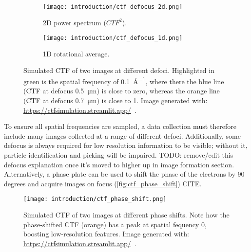\begin{figure}[ht]
    \centering
    \begin{subfigure}{.6\textwidth}
        \centering
        \texttt{[image: introduction/ctf\_defocus\_2d.png]}
        \caption{2D power spectrum ($CTF^2$).}
        \label{fig:ctf_defocus_2d}
    \end{subfigure}%

    \begin{subfigure}{\textwidth}
        \centering
        \texttt{[image: introduction/ctf\_defocus\_1d.png]}
        \caption{1D rotational average.}
        \label{fig:ctf_defocus_1d}
    \end{subfigure}%

    \caption[CTF: effect of defocus]{Simulated CTF of two images at different defoci. Highlighted in green is the spatial frequency of \qty{0.1}{\angstrom^{-1}}, where there the blue line (CTF at defocus \qty{0.5}{\micro\meter}) is close to zero, whereas the orange line (CTF at defocus \qty{0.7}{\micro\meter}) is close to 1. Image generated with: \url{https://ctfsimulation.streamlit.app/}~\cite{jiangWebbasedSimulationContrast2001}.}
    \label{fig:ctf_defocus}
\end{figure}

To ensure all spatial frequencies are sampled, a data collection must therefore include many images collected at a range of different defoci.
Additionally, some defocus is always required for low resolution information to be visible; without it, particle identification and picking will be impaired.
TODO: remove/edit this defocus explanation once it's moved to higher up in image formation section.
Alternatively, a phase plate can be used to shift the phase of the electrons by 90 degrees and acquire images on focus (\autoref{fig:ctf_phase_shift}) CITE.

\begin{figure}[ht]
    \centering
    \texttt{[image: introduction/ctf\_phase\_shift.png]}
    \caption[CTF: effect of phase shift]{Simulated CTF of two images at different phase shifts. Note how the phase-shifted CTF (orange) has a peak at spatial fequency \num{0}, boosting low-resolution features. Image generated with: \url{https://ctfsimulation.streamlit.app/}~\cite{jiangWebbasedSimulationContrast2001}.}
    \label{fig:ctf_phase_shift}
\end{figure}

